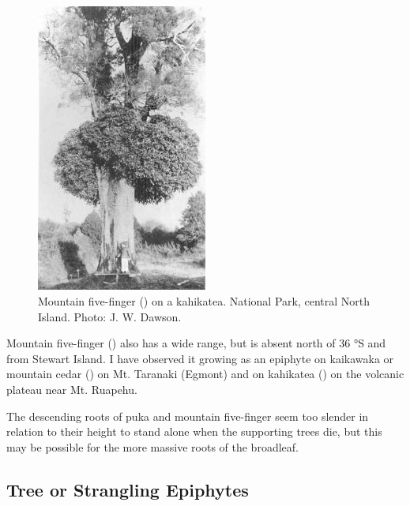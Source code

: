 \begin{figure}
	\includegraphics[width=0.5\textwidth]{graphics/figure49fivefinger.jpg}
	\centering
	\caption[Mountain five-finger on a kahikatea]{Mountain five-finger () on a kahikatea.
National Park, central North Island.
	Photo: J. W. Dawson.}
	\label{fig:49fivefinger}
\end{figure}

Mountain five-finger () also has a wide range, but is absent north of 36 °S and from Stewart Island.
I have observed it growing as an epiphyte on kaikawaka or mountain cedar () on Mt.
Taranaki (Egmont) and on kahikatea () on the volcanic plateau near Mt.
Ruapehu.

The descending roots of puka and mountain five-finger seem too slender in relation to their height to stand alone when the supporting trees die, but this may be possible for the more massive roots of the broadleaf.

\subsection{Tree or Strangling Epiphytes}

